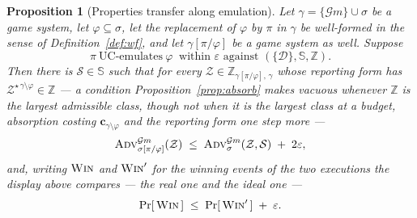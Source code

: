 \documentclass[11pt,a4paper]{article}
\newcommand{\Zenv}{\mathcal{Z}}
\newcommand{\Dum}{\mathcal{D}}
\newcommand{\Sim}{\mathcal{S}}
\newcommand{\bd}[1]{\mathbf{#1}}
\newcommand{\advtg}{\op{Adv}}
\newcommand{\SimSet}{\mathbb{S}}
\newcommand{\ZenvSet}{\mathbb{Z}}
\newcommand{\op}[1]{\textsc{#1}}
\newcommand{\Gm}{\mathcal{G}m}
\newcommand{\Win}{\op{Win}}
\theoremstyle{accentdef}
\theoremstyle{accentplain}
\newtheorem{proposition}[definition]{Proposition}
\begin{document}
\begin{proposition}[Properties transfer along emulation]\label{prop:proptransfer}
Let $\gamma = \{\Gm\} \cup \sigma$ be a game system, let $\varphi \subseteq \sigma$, let the
replacement of $\varphi$ by $\pi$ in $\gamma$ be well-formed in the sense of Definition~\ref{def:wf},
and let $\gamma[\pi/\varphi]$ be a game system as well. Suppose
\[
  \pi \ \text{UC-emulates} \ \varphi \ \text{ within } \varepsilon \text{ against }
  (\{\Dum\},\SimSet,\ZenvSet) .
\]
Then there is $\Sim \in \SimSet$ such that for every $\Zenv \in \ZenvSet_{\gamma[\pi/\varphi],\,\gamma}$
whose reporting form has $\Zenv^{\star\,\gamma \setminus \varphi} \in \ZenvSet$ --- a condition
Proposition~\ref{prop:absorb} makes vacuous whenever $\ZenvSet$ is the largest admissible class, though
not when it is the largest class at a \emph{budget}, absorption costing
$\bd{c}_{\gamma \setminus \varphi}$ and the reporting form one step more ---
\[
  \advtg^{\Gm}_{\sigma[\pi/\varphi]}(\Zenv)
  \;\leq\;
  \advtg^{\Gm}_{\sigma}(\Zenv,\Sim) \;+\; 2\varepsilon ,
\]
and, writing $\Win$ and $\Win'$ for the winning events of the two executions the display above
compares --- the real one and the ideal one ---
\[
  \Pr[\,\Win\,] \;\leq\; \Pr[\,\Win'\,] \;+\; \varepsilon .
\]
\end{proposition}
\end{document}
